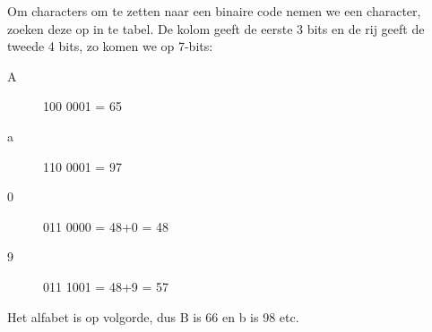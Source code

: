 Om characters om te zetten naar een binaire code nemen we een character, zoeken deze op in te tabel. De kolom geeft de eerste 3 bits en de rij geeft de tweede 4 bits, zo komen we op 7-bits:
\begin{description}
\item[A] 100 0001 = 65
\item[a] 110 0001 = 97
\item[0] 011 0000 = 48+0 = 48
\item[9] 011 1001 = 48+9 = 57
\end{description}
Het alfabet is op volgorde, dus B is 66 en b is 98 etc.


